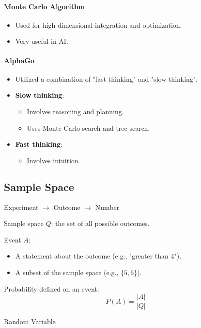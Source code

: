 \documentclass[12pt]{article}
\begin{document}
\paragraph{Monte Carlo Algorithm}
\begin{itemize}
    \item Used for high-dimensional integration and optimization.
    \item Very useful in AI.
\end{itemize}

\paragraph{AlphaGo}
\begin{itemize}
    \item Utilized a combination of "fast thinking" and "slow thinking".
    \item \textbf{Slow thinking}:
    \begin{itemize}
        \item Involves reasoning and planning.
        \item Uses Monte Carlo search and tree search.
    \end{itemize}
    \item \textbf{Fast thinking}:
    \begin{itemize}
        \item Involves intuition.
    \end{itemize}
\end{itemize}

\subsection{Sample Space}

\noindent
Experiment $\rightarrow$ Outcome $\rightarrow$ Number

\medskip

\noindent
Sample space $Q$: the set of all possible outcomes.

\medskip

\noindent
Event $A$:
\begin{itemize}
    \item A statement about the outcome (e.g., "greater than 4").
    \item A subset of the sample space (e.g., $\{5, 6\}$).
\end{itemize}

\noindent
Probability defined on an event:
\begin{equation}
    P(A) = \frac{|A|}{|Q|}
\end{equation}


Random Variable 
\end{document}

